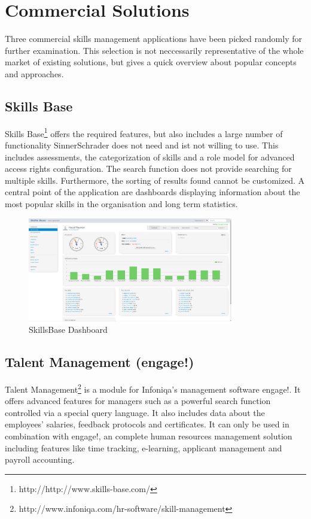 \section{Commercial Solutions}
Three commercial skills management applications have been picked randomly for further examination. This selection is not neccessarily representative of the whole market of existing solutions, but gives a quick overview about popular concepts and approaches.

\subsection{Skills Base}
Skills Base\footnote{http://http://www.skills-base.com/} offers the required features, but also includes a large number of functionality SinnerSchrader does not need and ist not willing to use. This includes assessments, the categorization of skills and a role model for advanced access rights configuration.
The search function does not provide searching for multiple skills. Furthermore, the sorting of results found cannot be customized. A central point of the application are dashboards displaying information about the most popular skills in the organisation and long term statistics.
\begin{figure}[!htp]
    \centering
    \includegraphics[width=0.8\textwidth]{images/skillsbase-dashboard.png}
    \caption{SkillsBase Dashboard}
    \label{fig:skillsbase_dashboard}
\end{figure}

\subsection{Talent Management (engage!)}
Talent Management\footnote{http://www.infoniqa.com/hr-software/skill-management} is a module for Infoniqa’s management software engage!. It offers advanced features for managers such as a powerful search function controlled via a special query language. It also includes data about the employees’ salaries, feedback protocols and certificates. It can only be used in combination with engage!, an complete human resources management solution including features like time tracking, e-learning, applicant management and payroll accounting.

